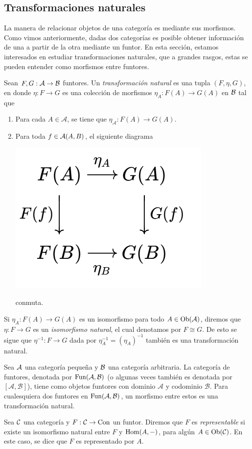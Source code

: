 \subsection{Transformaciones naturales}
La manera de relacionar objetos de una categoría es mediante sus morfismos. Como vimos anteriormente, dadas dos categorías es posible obtener información de una a partir de la otra mediante un funtor. En esta sección, estamos interesados en estudiar transformaciones naturales, que a grandes rasgos, estas se pueden entender como morfismos entre funtores.
\begin{definition} Sean $F,G:{\mathcal A}\to{\mathcal B}$ funtores. Un \emph{transformación natural} es una tupla $(F,\eta, G)$, en donde $\eta:F\to G$ es una colección de morfismos $\eta_A:F(A)\to G(A)$ en ${\mathcal B}$ tal que 
\begin{enumerate}
    \item Para cada $A\in\mathcal{A}$, se tiene que $\eta_\mathcal{A}:F(A)\rightarrow G(A)$.
    \item Para toda $f\in{\mathcal A}(A,B)$, el siguiente diagrama 
    \begin{center}
	\par\includegraphics[height=0.22\textwidth]{diagram1.5.1.png}
    \end{center}
    conmuta.
\end{enumerate}
\end{definition}
Si $\eta_A:F(A)\to G(A)$ es un isomorfismo para todo $A\in\operatorname{Ob}({\mathcal A})$, diremos que $\eta:F\to G$ es un \emph{isomorfismo natural}, el cual denotamos por $F\cong G$. De esto se sigue que  $\eta^{-1}:F\to G$ dada por $\eta^{-1}_A=(\eta_A)^{-1}$ también es una transformación natural.
\begin{ejp}
Sea ${\mathcal A}$ una categoría pequeña y ${\mathcal B}$ una categoría arbitraria. La categoría de funtores, denotada por ${\mathrm{Fun}}(\mathcal{A},\mathcal{B})$ (o algunas veces también es denotada por $[\mathcal{A},\mathcal{B}]$), tiene como objetos funtores con dominio $\mathcal{A}$ y codominio $\mathcal{B}$. Para cualesquiera dos funtores en ${\mathrm{Fun}}({\mathcal A},{\mathcal B})$, un morfismo entre estos es una transformación natural.
 \end{ejp}
 \begin{definition} Sea ${\mathcal C}$ una categoría y $F:{\mathcal C}\to{\mathrm{Con}}$ un funtor. Diremos que $F$ es \emph{representable} si existe un isomorfismo natural entre $F$ y $\operatorname{Hom}(A,-)$, para algún $A\in \operatorname{Ob}({\mathcal C})$. En este caso, se dice que $F$ es representado por $A$.
 \end{definition}
